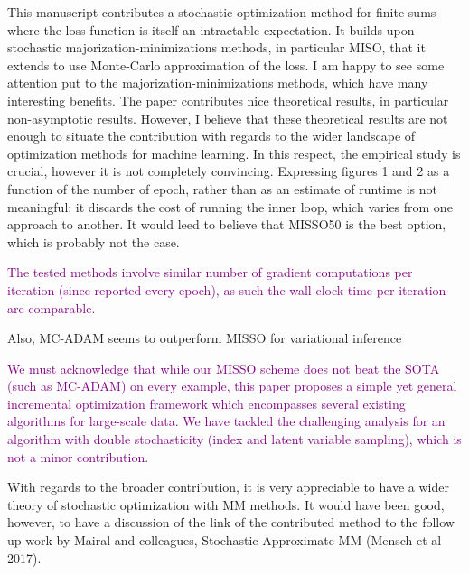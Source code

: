 \documentclass{article} %
\theoremstyle{t}
\begin{document}
This manuscript contributes a stochastic optimization method for finite sums where the loss function is itself an intractable expectation. It builds upon stochastic majorization-minimizations methods, in particular MISO, that it extends to use Monte-Carlo approximation of the loss.
I am happy to see some attention put to the majorization-minimizations methods, which have many interesting benefits. The paper contributes nice theoretical results, in particular non-asymptotic results. However, I believe that these theoretical results are not enough to situate the contribution with regards to the wider landscape of optimization methods for machine learning.
In this respect, the empirical study is crucial, however it is not completely convincing. Expressing figures 1 and 2 as a function of the number of epoch, rather than as an estimate of runtime is not meaningful: it discards the cost of running the inner loop, which varies from one approach to another. It would leed to believe that MISSO50 is the best option, which is probably not the case.

\textcolor{purple}{
The tested methods involve similar number of gradient computations per iteration (since reported every epoch), as such the wall clock time per iteration are comparable.
}


Also, MC-ADAM seems to outperform MISSO for variational inference

\textcolor{purple}{
We must acknowledge that while our MISSO scheme does not beat the SOTA (such as MC-ADAM) on every example, this paper proposes a simple yet general incremental optimization framework which encompasses several existing algorithms for large-scale data. 
We have tackled the challenging analysis for an algorithm with double stochasticity (index and latent variable sampling), which is not a minor contribution.
}


With regards to the broader contribution, it is very appreciable to have a wider theory of stochastic optimization with MM methods. It would have been good, however, to have a discussion of the link of the contributed method to the follow up work by Mairal and colleagues, Stochastic Approximate MM (Mensch et al 2017).
\end{document}
